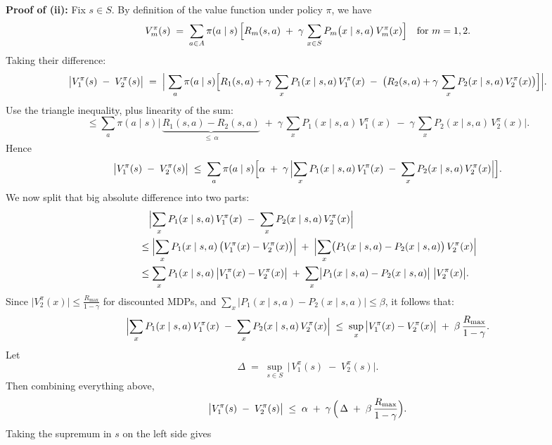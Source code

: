 \medskip
\noindent \textbf{Proof of (ii):}  
Fix \(s\in S\).  By definition of the value function under policy \(\pi\), we have
\[
  V_m^{\pi}(s)
  \;=\;
  \sum_{a\in A} \pi(a\mid s)\,\Bigl[
       R_{m}(s,a)
       \;+\;\gamma\,\sum_{x\in S}P_{m}\bigl(x\mid s,a\bigr)\,V_m^{\pi}(x)
  \Bigr]
  \quad\text{for }m=1,2.
\]
Taking their difference:
\[
  \bigl|V_{1}^{\pi}(s)\;-\;V_{2}^{\pi}(s)\bigr|
  \;=\;
  \Bigl|\;
     \sum_{a}\pi(a\mid s)
     \Bigl[
       R_{1}(s,a) + \gamma\,\sum_{x}P_{1}(x\mid s,a)\,V_{1}^{\pi}(x)
       \;-\;
       \bigl(R_{2}(s,a) + \gamma\,\sum_{x}P_{2}(x\mid s,a)\,V_{2}^{\pi}(x)\bigr)
     \Bigr]
  \Bigr|.
\]
Use the triangle inequality, plus linearity of the sum:
\[
  \le
  \sum_{a}\pi(a\mid s)\biggl|\,
       \underbrace{R_{1}(s,a) - R_{2}(s,a)}_{\le\,\alpha}
       \;+\;
       \gamma\,\sum_{x}P_{1}(x\mid s,a)\,V_{1}^{\pi}(x)
       \;-\;
       \gamma\,\sum_{x}P_{2}(x\mid s,a)\,V_{2}^{\pi}(x)
  \biggr|.
\]
Hence
\[
  \bigl|V_{1}^{\pi}(s)\;-\;V_{2}^{\pi}(s)\bigr|
  \;\le\;
  \sum_{a}\pi(a\mid s)\Bigl[
     \alpha
     \;+\;
     \gamma \,\Bigl|\sum_{x}P_{1}(x\mid s,a)\,V_{1}^{\pi}(x)\;-\;\sum_{x}P_{2}(x\mid s,a)\,V_{2}^{\pi}(x)\Bigr|
  \Bigr].
\]
We now split that big absolute difference into two parts:
\[
  \begin{aligned}
  &\quad
  \Bigl|\sum_{x}P_{1}(x\mid s,a)\,V_{1}^{\pi}(x)\;-\;\sum_{x}P_{2}(x\mid s,a)\,V_{2}^{\pi}(x)\Bigr|
  \\
  &\le
  \Bigl|\sum_{x}P_{1}(x\mid s,a)\,\bigl(V_{1}^{\pi}(x)-V_{2}^{\pi}(x)\bigr)\Bigr|
  \;+\;
  \Bigl|\sum_{x}\bigl(P_{1}(x\mid s,a)-P_{2}(x\mid s,a)\bigr)\,V_{2}^{\pi}(x)\Bigr|
  \\
  &\le
  \sum_{x}P_{1}(x\mid s,a)\,\bigl|V_{1}^{\pi}(x)-V_{2}^{\pi}(x)\bigr|
  \;+\;
  \sum_{x}\bigl|P_{1}(x\mid s,a)-P_{2}(x\mid s,a)\bigr|\;\bigl|V_{2}^{\pi}(x)\bigr|.
  \end{aligned}
\]
Since \(\bigl|V_{2}^{\pi}(x)\bigr|\le \frac{R_{\max}}{1-\gamma}\) for discounted MDPs, 
and 
\(\sum_{x}\bigl|P_{1}(x\mid s,a)-P_{2}(x\mid s,a)\bigr|\le \beta\), 
it follows that:
\[
  \Bigl|\sum_{x}P_{1}(x\mid s,a)\,V_{1}^{\pi}(x)
          \;-\;\sum_{x}P_{2}(x\mid s,a)\,V_{2}^{\pi}(x)\Bigr|
  \;\le\;
  \sup_{x}\,\bigl|V_{1}^{\pi}(x)-V_{2}^{\pi}(x)\bigr|
  \;+\;\beta \,\frac{R_{\max}}{1-\gamma}.
\]
Let
\[
   \Delta \;=\;\sup_{s\in S}\,\bigl|\,V_{1}^{\pi}(s)\;-\;V_{2}^{\pi}(s)\bigr|.
\]
Then combining everything above,
\[
  \bigl|V_{1}^{\pi}(s)\;-\;V_{2}^{\pi}(s)\bigr|
  \;\le\;
  \alpha \;+\;\gamma\,\Bigl(\,\Delta \;+\;\beta\,\frac{R_{\max}}{1-\gamma}\Bigr).
\]
Taking the supremum in \(s\) on the left side gives
